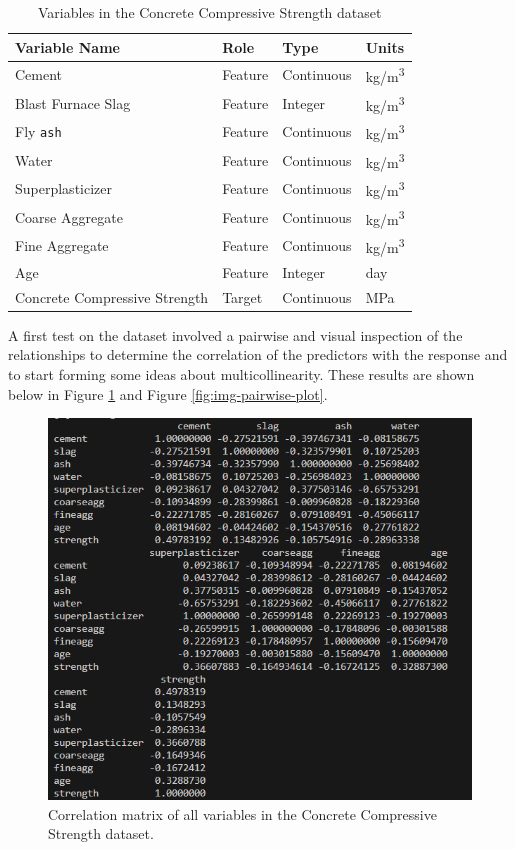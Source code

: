 \documentclass[]{article}
\begin{document}
\begin{table}[H]
	\centering
	\begin{tabular}{|l|l|l|l|}
		\hline
		\textbf{Variable Name} & \textbf{Role} & \textbf{Type} & \textbf{Units} \\ \hline
		Cement                 & Feature       & Continuous     & kg/m\textsuperscript{3} \\ \hline
		Blast Furnace Slag     & Feature       & Integer        & kg/m\textsuperscript{3} \\ \hline
		Fly \texttt{ash}                & Feature       & Continuous     & kg/m\textsuperscript{3} \\ \hline
		Water                  & Feature       & Continuous     & kg/m\textsuperscript{3} \\ \hline
		Superplasticizer       & Feature       & Continuous     & kg/m\textsuperscript{3} \\ \hline
		Coarse Aggregate       & Feature       & Continuous     & kg/m\textsuperscript{3} \\ \hline
		Fine Aggregate         & Feature       & Continuous     & kg/m\textsuperscript{3} \\ \hline
		Age                    & Feature       & Integer        & day \\ \hline
		Concrete Compressive Strength & Target & Continuous     & MPa \\ \hline
	\end{tabular}
	\caption{Variables in the Concrete Compressive Strength dataset}
	\label{tab:concrete_variables}
\end{table}

A first test on the dataset involved a pairwise and visual inspection of the relationships to determine the correlation of the predictors with the response and to start forming some ideas about multicollinearity. These results are shown below in Figure \ref{fig:img-pairwise-numeric} and Figure \ref{fig:img-pairwise-plot}.



\begin{figure}[H]
	\centering
	\includegraphics[width=0.5\linewidth]{img/img-pairwise-numeric}
	\caption{ Correlation matrix of all variables in the Concrete Compressive Strength dataset. }
	\label{fig:img-pairwise-numeric}
\end{figure}
\end{document}
